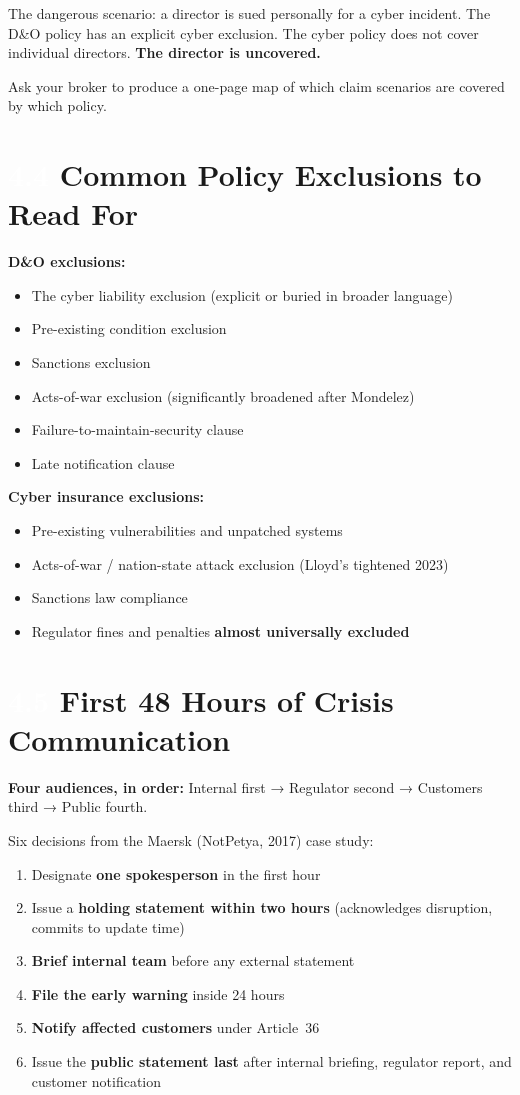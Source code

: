 \documentclass[11pt,a4paper,twoside]{book}
\newcommand{\lessontag}[1]{%
  \texorpdfstring{%
    \setlength{\fboxsep}{3pt}\colorbox{nisd2blue}{\textcolor{white}{\footnotesize\bfseries #1}}\quad%
  }{Lesson #1\ }%
}
\begin{document}
The dangerous scenario: a director is sued personally for a cyber incident. The D\&O policy has an explicit cyber exclusion. The cyber policy does not cover individual directors. \textbf{The director is uncovered.}

Ask your broker to produce a one-page map of which claim scenarios are covered by which policy.

\section{\lessontag{4.4}Common Policy Exclusions to Read For}

\textbf{D\&O exclusions:}
\begin{itemize}
  \item The cyber liability exclusion (explicit or buried in broader language)
  \item Pre-existing condition exclusion
  \item Sanctions exclusion
  \item Acts-of-war exclusion (significantly broadened after Mondelez)
  \item Failure-to-maintain-security clause
  \item Late notification clause
\end{itemize}

\textbf{Cyber insurance exclusions:}
\begin{itemize}
  \item Pre-existing vulnerabilities and unpatched systems
  \item Acts-of-war / nation-state attack exclusion (Lloyd's tightened 2023)
  \item Sanctions law compliance
  \item Regulator fines and penalties \textbf{almost universally excluded}
\end{itemize}

\section{\lessontag{4.5}First 48 Hours of Crisis Communication}

\textbf{Four audiences, in order:} Internal first → Regulator second → Customers third → Public fourth.

Six decisions from the Maersk (NotPetya, 2017) case study:
\begin{enumerate}
  \item Designate \textbf{one spokesperson} in the first hour
  \item Issue a \textbf{holding statement within two hours} (acknowledges disruption, commits to update time)
  \item \textbf{Brief internal team} before any external statement
  \item \textbf{File the early warning} inside 24 hours
  \item \textbf{Notify affected customers} under Article~36
  \item Issue the \textbf{public statement last} after internal briefing, regulator report, and customer notification
\end{enumerate}
\end{document}
